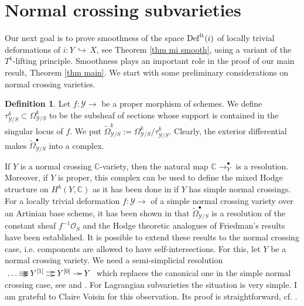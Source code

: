 \documentclass[a4paper,11pt,final]{amsart}
\theoremstyle{plain}
\theoremstyle{definition}
\newtheorem{definition}[subsection]{Definition}
\numberwithin{equation}{section}
\theoremstyle{remark}
\begin{document}
\section{Normal crossing subvarieties}\label{sec symplectic defo}
Our next goal is to prove smoothness of the space ${{\operatorname{Def}}}^{{\rm{lt}}}(i)$ of locally trivial deformations of $i:Y{{\, \hookrightarrow\,}} X$, see Theorem \ref{thm mi smooth}, using a variant of the $T^1$-lifting principle. 
Smoothness plays an important role in the proof of our main result, Theorem \ref{thm main}. 
We start with some preliminary considerations on normal crossing varieties.

\begin{definition}\label{definition tom}
Let $f:{{\mathcal Y}} {\xrightarrow{\ \ }}$ be a proper morphism of schemes. We define $\tau^k_{{{\mathcal Y}}/S} \subset \Omega^k_{{{\mathcal Y}}/S}$ to be the subsheaf of sections whose support is contained in the singular locus of $f$. 
We put ${\widetilde{\Omega}}^k_{{{\mathcal Y}}/S}:=\Omega^k_{{{\mathcal Y}}/S}/\tau^k_{{{\mathcal Y}}/S}$. Clearly, the exterior differential makes ${\widetilde{\Omega}}_{{{\mathcal Y}}/S}^\bullet$ into a complex.
\end{definition}
If $Y$ is a normal crossing ${{\mathbb C}}$-variety, then the natural map ${{\mathbb C}} {\xrightarrow{\ \ }}_Y^\bullet$ is a resolution. Moreover, if $Y$ is proper, this complex can be used to define the mixed Hodge structure on $H^k(Y,{{\mathbb C}})$ as it has been done in \cite{Fr} if $Y$ has simple normal crossings. For a locally trivial deformation $f:{{\mathcal Y}}{\xrightarrow{\ \ }}$ of a simple normal crossing variety over an Artinian base scheme, it has been shown in \cite{CL12} that ${\widetilde{\Omega}}_{{{\mathcal Y}}/S}^\bullet$ is a resolution of the constant sheaf $f^{-1}{{\mathcal O}}_S$ and the Hodge theoretic analogues of Friedman's results have been established. It is possible to extend these results to the normal crossing case, i.e. components are allowed to have self-intersections. For this, let $Y$ be a normal crossing variety. We need a semi-simplicial resolution $\xymatrix@C=1em{
\ldots  \ar[r]\ar@<0.5ex>[r]\ar@<-0.5ex>[r] & Y^{[1]} \ar@<0.5ex>[r]\ar@<-0.5ex>[r] & Y^{[0]} \ar[r]& Y \\ }$ which replaces the canonical one in the simple normal crossing case, see \cite[p. 77]{Fr} and \cite[4.4]{CL12}. 
For Lagrangian subvarieties the situation is very simple. I am grateful to Claire Voisin for this observation. Its proof is straightforward, cf. \cite[Lemma 5.3]{GLR}.
\end{document}
